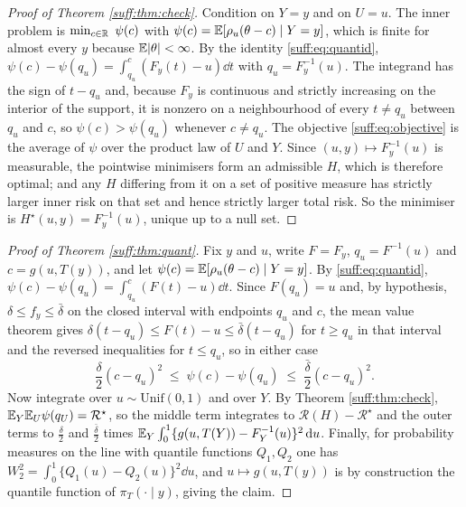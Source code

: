 \begin{proof}[Proof of Theorem \ref{suff:thm:check}]
Condition on $Y=y$ and on $U=u$. The inner problem is
$\min_{c\in\R}\ \psi(c)$ with $\psi(c)=\mathbb{E}[\rho_u(\theta-c)\mid Y=y]$, which is finite for
almost every $y$ because $\mathbb{E}|\theta|<\infty$. By the identity \eqref{suff:eq:quantid},
$\psi(c)-\psi(q_u)=\int_{q_u}^{c}(F_y(t)-u)\dd t$ with $q_u=F_y^{-1}(u)$. The integrand has
the sign of $t-q_u$ and, because $F_y$ is continuous and strictly increasing on the interior
of the support, it is nonzero on a neighbourhood of every $t\ne q_u$ between $q_u$ and $c$, so
$\psi(c)>\psi(q_u)$ whenever $c\ne q_u$. The objective \eqref{suff:eq:objective} is the
average of $\psi$ over the product law of $U$ and $Y$. Since $(u,y)\mapsto F_y^{-1}(u)$ is
measurable, the pointwise minimisers form an admissible $H$, which is therefore optimal; and
any $H$ differing from it on a set of positive measure has strictly larger inner risk on that
set and hence strictly larger total risk. So the minimiser is $H^\star(u,y)=F^{-1}_y(u)$, unique
up to a null set.
\end{proof}

\begin{proof}[Proof of Theorem \ref{suff:thm:quant}]
Fix $y$ and $u$, write $F=F_y$, $q_u=F^{-1}(u)$ and $c=g(u,T(y))$, and let
$\psi(c)=\mathbb{E}[\rho_u(\theta-c)\mid Y=y]$. By \eqref{suff:eq:quantid},
$\psi(c)-\psi(q_u)=\int_{q_u}^{c}(F(t)-u)\dd t$. Since $F(q_u)=u$ and, by hypothesis,
$\delta\le f_y\le \bar\delta$ on the closed interval with endpoints $q_u$ and $c$, the mean value
theorem gives $\delta(t-q_u)\le F(t)-u\le \bar\delta(t-q_u)$ for $t\ge q_u$ in that interval and the
reversed inequalities for $t\le q_u$, so in either case
\[
\frac{\delta}{2}(c-q_u)^2 \;\le\; \psi(c)-\psi(q_u)\;\le\;\frac{\bar\delta}{2}(c-q_u)^2 .
\]
Now integrate over $u\sim\mathrm{Unif}(0,1)$ and over $Y$. By Theorem \ref{suff:thm:check},
$\mathbb{E}_Y\mathbb{E}_U\psi(q_U)=\mathcal{R}^\star$, so the middle term integrates to
$\mathcal{R}(H)-\mathcal{R}^\star$ and the outer terms to $\tfrac{\delta}{2}$ and
$\tfrac{\bar\delta}{2}$ times $\mathbb{E}_Y\int_0^1\{g(u,T(Y))-F_Y^{-1}(u)\}^2\,\mathrm{d} u$. Finally, for probability
measures on the line with quantile functions $Q_1,Q_2$ one has
$W_2^2=\int_0^1\{Q_1(u)-Q_2(u)\}^2\dd u$, and $u\mapsto g(u,T(y))$ is by construction the
quantile function of $\pi_T(\cdot\mid y)$, giving the claim.
\end{proof}

